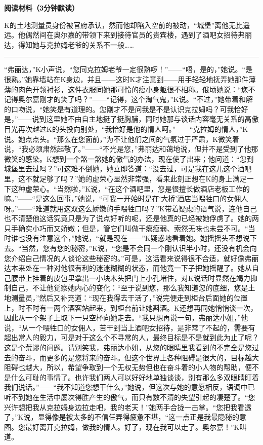 \documentclass[12pt,a4paper]{article}
\begin{document}
\onehalfspacing

{\large\bfseries 阅读材料（3分钟默读）}

\vspace{0.8em}

{K的土地测量员身份被官府承认，然而他却陷入空前的被动，“城堡”离他无比遥远。他偶然间在奥尔嘉的带领下来到接待官员的贵宾楼，遇到了酒吧女招待弗丽达，得知她与克拉姆老爷的关系不一般……}

\vspace{1em}
\noindent\rule{\textwidth}{0.4pt}
\vspace{0.8em}

{\kaifont
“弗丽达，”K小声说，“您同克拉姆老爷一定很熟啰！”——“唔，是的，”她说。“是很熟。”她靠墙站在K身边，并且——这时K才注意到——用手轻轻地抚弄她那件薄薄的肉色开领衬衫，这件衣服同她那可怜的瘦小身躯很不相称。俄顷她说：“您不记得奥尔嘉刚才的笑了吗？”——“记得，这个淘气鬼，”K说。“不过，”她带着和解的口吻说，“她笑是有道理的。您刚才不是问我是不是认识克拉姆吗？可我恰好是，”——说到这里她不由自主地挺了挺胸脯，同时她那与谈话内容毫无关系的高傲目光再次越过K的头投向别处，“我恰好是他的情人呵。”——“克拉姆的情人，”K说。她点点头。“那么在您面前，”为不让他们之间的气氛过于严肃，K微笑着说，“我必须肃然起敬了。”——“不光是您，”弗丽达和蔼地说，但并不是受到了他那微笑的感染。K想到一个煞一煞她的傲气的办法，现在使了出来；他问道：“您到城堡里去过吗？”可这难不倒她，她立即答道：“没去过，可是我在这儿这个酒吧里，这不就足够了吗？”她的虚荣心显然非常强，看来此刻正想在K的身上满足一下这种虚荣心。“当然啦，”K说，“在这个酒吧里，您是很擅长做酒店老板工作的嘛。”——“是这么回事，”她说，“可我一开始时是在‘大桥’酒店当喂牲口的女佣人呀。”——“难道就用这双这么娇嫩的手喂牲口吗？”K带着疑虑的语气说，连他自己也不清楚他这话究竟只是为了说点好听的呢，还是他真的已经被她俘虏了。她的两只手确实小巧而又娇嫩；但是，管它们叫做干瘪瘦弱、索然无味也未尝不可。“当时谁也没有注意这个，”她说，“就是现在——”K疑惑地看着她。她摇摇头不想说下去。“当然，您有您的秘密，”K说，“您是不会同一个刚认识半小时，还没有机会向您介绍自己情况的人谈论这些秘密的。”可是，这话看来说得很不合适，就好像弗丽达本来处在一种对他很有利的迷迷糊糊的状态，而他竟一下子把她摇醒了。她从自己腰带上挂着的皮包里拿出一小块木头把门上小孔堵住，对K说话时显然在竭力抑制自己，不让他觉察她内心的变化：“至于说到您，那么我知道您的底细，您是土地测量员，”然后又补充道：“现在我得去干活了，”说完便走到柜台后面她的位置上，时不时有一两个酒客站起来，到柜台前让她斟酒。K还想再同她悄悄谈一次，因此从一个架子上取下一只空杯向她走去。“我只想再说一句，弗丽达小姐，”他说，“从一个喂牲口的女佣人，苦干到当上酒吧女招待，是非常了不起的，需要有超出常人的毅力，可是对于这么个不寻常的人，最终目标是不是就到此为止了呢？这是个荒谬的问题。请别笑我，弗丽达小姐，从您的眼睛里我看到的不完全是您过去的奋斗，而更多的是您将来的奋斗。但这个世界上各种阻碍是很大的，目标越大阻碍也越大，所以，希望争取到一个无权无势但也在奋斗着的小人物的帮助，便不是什么可耻的事情了。也许我们两人可以好好地单独谈谈，别有那么多双眼睛盯着我们说话。”——“我不知道您想干什么，”她说，但这次与她的意愿相反，语调中已听不到她在生活中屡次得胜产生的傲气，而只有数不清的失望引起的凄楚了。“您兴许想把我从克拉姆身边拉走吧，我的老天！”她两手合拢一击掌。“您把我看透了，”K说，显得像是被太多的不信任弄得疲惫不堪，“这一点正是我最隐秘的意图。您最好离开克拉姆，做我的情人。好了，现在我可以走了。奥尔嘉！”K叫道。
}
\end{document}
